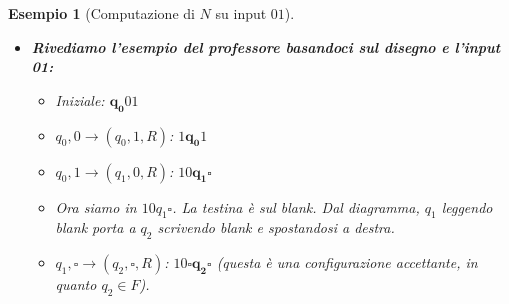 \documentclass[a4paper]{article}
\newtheorem{example}{Esempio}
\newcommand{\blankS}{\ensuremath{\square}}
\begin{document}
\begin{example}[Computazione di $N$ su input $01$]
\begin{enumerate}
    \begin{itemize}
        \item \textbf{Rivediamo l'esempio del professore basandoci sul disegno e l'input 01:}
        \begin{itemize}
            \item Iniziale: $\mathbf{q_0}01$
            \item $q_0,0 \to (q_0,1,R)$: $1\mathbf{q_0}1$
            \item $q_0,1 \to (q_1,0,R)$: $10\mathbf{q_1}\blankS$
            \item Ora siamo in $10q_1\blankS$. La testina è sul blank. Dal diagramma, $q_1$ leggendo blank porta a $q_2$ scrivendo blank e spostandosi a destra.
            \item $q_1,\blankS \to (q_2,\blankS,R)$: $10\blankS\mathbf{q_2}\blankS$ (questa è una configurazione accettante, in quanto $q_2 \in F$).
        \end{itemize}
        

\end{itemize}
\end{enumerate}
\end{example}
\end{document}
